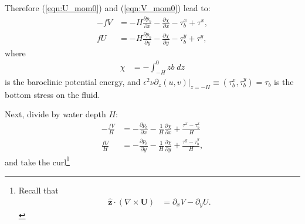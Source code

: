 \documentclass[10pt]{amsart}
\begin{document}
 Therefore (\ref{eqn:U_mom0}) and (\ref{eqn:V_mom0}) lead to:
 \begin{align}
- f V & =  - H \frac{\partial p_b}{\partial x} - \frac{\partial \chi}{\partial x}  - \tau^x_b + \tau^x , \label{eqn:U_mom} \\
f  U & = - H \frac{\partial p_b}{\partial y} - \frac{\partial \chi }{\partial y}  - \tau^y_b + \tau^y \label{eqn:V_mom} ,
\end{align}
where
\begin{align}
\chi & = - \int_{-H}^0 z b \; dz
\label{eqn:baroclinic_PE}
\end{align}
is the baroclinic potential energy, and $\epsilon^2  \nu \left. \partial_z (u,v) \right|_{z = -H}  \equiv (\tau^x_b, \tau^y_b) = \tau_b$ is the bottom stress on the fluid.

Next, divide by water depth $H$:
 \begin{align}
- \frac{f V}{H} & =  - \frac{\partial p_b}{\partial x} - \frac{1}{H} \frac{\partial \chi}{\partial x} + \frac{\tau^x - \tau^x_b}{H}   \\
\frac{f  U}{H} & = - \frac{\partial p_b}{\partial y} - \frac{1}{H} \frac{\partial \chi }{\partial y} + \frac{\tau^y - \tau^y_b}{H} ,
\end{align}
and take the curl\footnote{
Recall that 
\begin{align}
{\hat{\mathbf z}} \cdot \left( \nabla \times {\mathbf U} \right) & = \partial_x V - \partial_y U .
\end{align}
}
\end{document}
